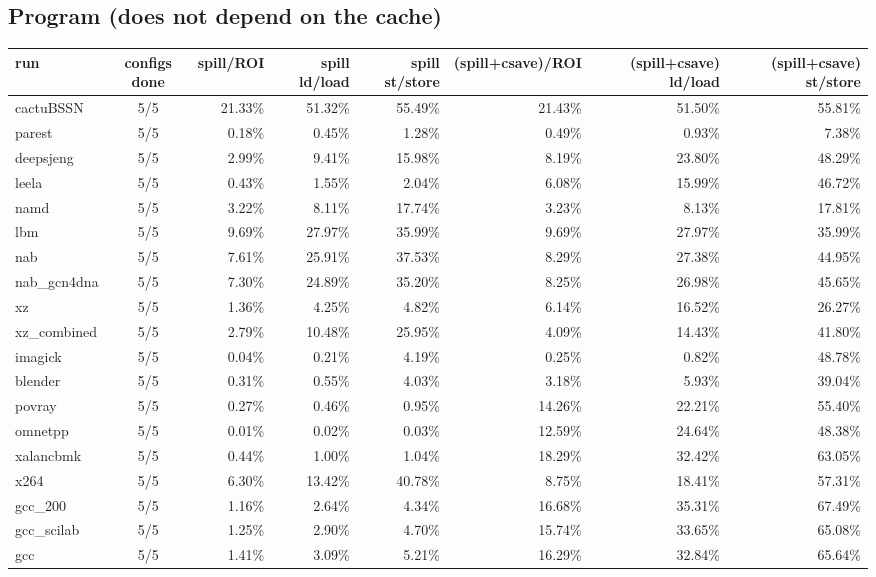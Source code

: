 \documentclass[10pt,a4paper,landscape]{article}
\begin{document}
\subsection*{Program (does not depend on the cache)}
{\footnotesize
\begin{longtable}{lcrrrrrr}
\toprule
run & configs done & spill/ROI & spill ld/load & spill st/store & (spill+csave)/ROI & (spill+csave) ld/load & (spill+csave) st/store \\
\midrule
\endhead
\bottomrule
\endfoot
cactuBSSN & 5/5 & 21.33\% & 51.32\% & 55.49\% & 21.43\% & 51.50\% & 55.81\% \\
parest & 5/5 & 0.18\% & 0.45\% & 1.28\% & 0.49\% & 0.93\% & 7.38\% \\
deepsjeng & 5/5 & 2.99\% & 9.41\% & 15.98\% & 8.19\% & 23.80\% & 48.29\% \\
leela & 5/5 & 0.43\% & 1.55\% & 2.04\% & 6.08\% & 15.99\% & 46.72\% \\
namd & 5/5 & 3.22\% & 8.11\% & 17.74\% & 3.23\% & 8.13\% & 17.81\% \\
lbm & 5/5 & 9.69\% & 27.97\% & 35.99\% & 9.69\% & 27.97\% & 35.99\% \\
nab & 5/5 & 7.61\% & 25.91\% & 37.53\% & 8.29\% & 27.38\% & 44.95\% \\
nab\_gcn4dna & 5/5 & 7.30\% & 24.89\% & 35.20\% & 8.25\% & 26.98\% & 45.65\% \\
xz & 5/5 & 1.36\% & 4.25\% & 4.82\% & 6.14\% & 16.52\% & 26.27\% \\
xz\_combined & 5/5 & 2.79\% & 10.48\% & 25.95\% & 4.09\% & 14.43\% & 41.80\% \\
imagick & 5/5 & 0.04\% & 0.21\% & 4.19\% & 0.25\% & 0.82\% & 48.78\% \\
blender & 5/5 & 0.31\% & 0.55\% & 4.03\% & 3.18\% & 5.93\% & 39.04\% \\
povray & 5/5 & 0.27\% & 0.46\% & 0.95\% & 14.26\% & 22.21\% & 55.40\% \\
omnetpp & 5/5 & 0.01\% & 0.02\% & 0.03\% & 12.59\% & 24.64\% & 48.38\% \\
xalancbmk & 5/5 & 0.44\% & 1.00\% & 1.04\% & 18.29\% & 32.42\% & 63.05\% \\
x264 & 5/5 & 6.30\% & 13.42\% & 40.78\% & 8.75\% & 18.41\% & 57.31\% \\
gcc\_200 & 5/5 & 1.16\% & 2.64\% & 4.34\% & 16.68\% & 35.31\% & 67.49\% \\
gcc\_scilab & 5/5 & 1.25\% & 2.90\% & 4.70\% & 15.74\% & 33.65\% & 65.08\% \\
gcc & 5/5 & 1.41\% & 3.09\% & 5.21\% & 16.29\% & 32.84\% & 65.64\% \\

\end{longtable}}
\end{document}
